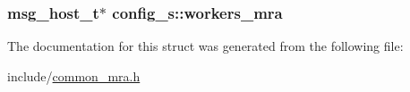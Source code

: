 \hypertarget{structconfig__s_a25044c7b99a27e3823ec661de25d38d5}{
\subsubsection[{workers\-\_\-mra}]{\setlength{\rightskip}{0pt plus 5cm}msg\-\_\-host\-\_\-t$\ast$ {\bf config\-\_\-s\-::workers\-\_\-mra}}}\label{structconfig__s_a25044c7b99a27e3823ec661de25d38d5}


\-The documentation for this struct was generated from the following file\-:\begin{DoxyCompactItemize}
\item 
include/\hyperlink{common__mra_8h}{common\-\_\-mra.\-h}\end{DoxyCompactItemize}
